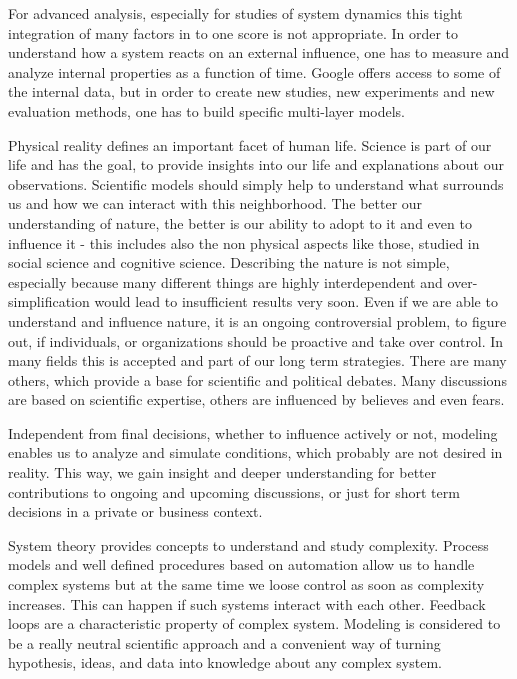 \documentclass[a4paper,10pt]{scrbook}
\begin{document}
For advanced analysis, especially for studies of system dynamics this tight integration of many factors in to one score is not appropriate. In order to understand how a system reacts on an external influence, one has to measure and analyze internal properties as a function of time. Google offers access to some of the internal data, but in order to create new studies, new experiments and new evaluation methods, one has to build specific multi-layer models. 


Physical reality defines an important facet of human life. Science is part of our life and has the goal, to provide insights into our life and explanations about our observations. Scientific models should simply help to understand what surrounds us and how we can interact with this neighborhood. The better our understanding of nature, the better is our ability to adopt to it and even to influence it - this includes also the non physical aspects like those, studied in social science and cognitive science. Describing the nature is not simple, especially because many different things are highly interdependent and over-simplification would lead to insufficient results very soon. Even if we are able to understand and influence nature, it is an ongoing controversial problem, to figure out, if individuals, or organizations should be proactive and take over control. In many fields this is accepted and part of our long term strategies. There are many others, which provide a base for scientific and political debates. Many discussions are based on scientific expertise, others are influenced by believes and even fears.

Independent from final decisions, whether to influence actively or not, modeling enables us to analyze and simulate conditions, which probably are not desired in reality. This way, we gain insight and deeper understanding for better contributions to ongoing and upcoming discussions, or just for short term decisions in a private or business context. 

System theory provides concepts to understand and study complexity. Process models and well defined procedures based on automation allow us to handle complex systems but at the same time we loose control as soon as complexity increases. This can happen if such systems interact with each other. Feedback loops are a characteristic property of complex system. Modeling is considered to be a really neutral scientific approach and a convenient way of turning hypothesis, ideas, and data into knowledge about any complex system.   
\end{document}
